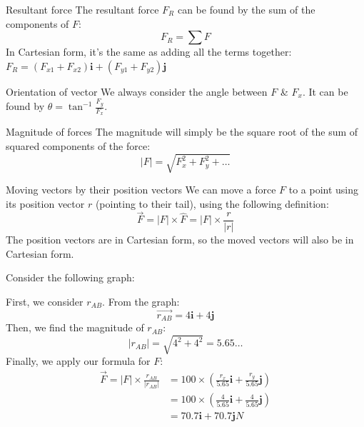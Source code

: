 \begin{knBox}
    {Resultant force}
    The resultant force $F_R$ can be found by the sum of the components of $F$:
    \[F_R=\sum F\]
    In Cartesian form, it's the same as adding all the terms together: $F_R=(F_{x1}+F_{x2})\boldsymbol{i}+(F_{y1}+F_{y2})\boldsymbol{j}$
\end{knBox}
\begin{knBox}
    {Orientation of vector}
    We always consider the angle between $F$ \& $F_x$. It can be found by $\theta=\tan^{-1}\frac{F_y}{F_x}$.
\end{knBox}
\begin{knBox}
    {Magnitude of forces}
    The magnitude will simply be the square root of the sum of squared components of the force:
    \[|F|=\sqrt{F_x^2+F_y^2+\dots}\]

\end{knBox}
\begin{definition}
    {Moving vectors by their position vectors}
    We can move a force $F$ to a point using its position vector $r$ (pointing to their tail), using the following definition:
    \[\vec{F}=|F|\times\hat{F}=|F|\times\frac{r}{|r|}\]
    The position vectors are in Cartesian form, so the moved vectors will also be in Cartesian form.
    \tcblower
    \begin{center}
        Consider the following graph:
        \begin{figure}[H]
            \centering
        \end{figure}

        First, we consider $r_{AB}$. From the graph:
        \[\vec{r_{AB}}=4\boldsymbol{i}+4\boldsymbol{j}\]
        Then, we find the magnitude of $r_{AB}$:
        \[|r_{AB}|=\sqrt{4^2+4^2}=5.65\dots\]
        Finally, we apply our formula for $F$:
        \begin{align*}
            \vec{F}=|F|\times\frac{r_{AB}}{|r_{AB}|} & =100\times(\frac{r_x}{5.65}\boldsymbol{i}+\frac{r_y}{5.65}\boldsymbol{j}) \\&=100\times(\frac{4}{5.65}\boldsymbol{i}+\frac{4}{5.65}\boldsymbol{j})\\&=70.7\boldsymbol{i}+70.7\boldsymbol{j}N
        \end{align*}
    \end{center}
\end{definition}
